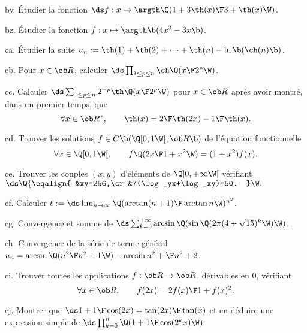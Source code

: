 \exo [Level=1,Fight=2,Learn=1,Field=\Fonctions,Type=\Exercices,Origin=] by. 
Étudier la fonction $\ds f:x\mapsto\argth\Q({1+3\th(x)\F3+\th(x)}\W)$. 

\exo [Level=1,Fight=2,Learn=1,Field=\Fonctions,Type=\Exercices,Origin=] bz. 
Étudier la fonction $f:x\mapsto\argth\b(4x^3-3x\b)$. 

\exo [Level=1,Fight=1,Learn=1,Field=\Suites|\TrigonométrieHyperbolique,Type=\Exercices,Origin=] ca. 
Étudier la suite $u_n:=\th(1)+\th(2)+\cdots+\th(n)-\ln\b(\ch(n)\b)$. 

\exo [Level=1,Fight=1,Learn=0,Field=\TrigonométrieHyperbolique,Type=\Exercices,Origin=] cb. 
Pour $x\in\ob R$, calculer $\ds\prod_{1\le p\le n}\ch\Q({x\F 2^p}\W)$. 

\exo [Level=1,Fight=1,Learn=1,Field=\TrigonométrieHyperbolique,Type=\Exercices,Origin=] cc. 
Calculer $\ds\sum_{1\le p\le n}2^{-p}\th\Q({x\F2^p}\W)$ pour $x\in\ob R$ après avoir montré, dans un premier temps, que 
$$
\forall x\in\ob R^*, \qquad \th(x)={2\F\th(2x)}-{1\F \th(x)}.
$$

\exo  [Level=1,Fight=3,Learn=1,Field=\Fonctions|\Trigonométrie,Type=\Exercices,Origin=] cd. 
Trouver les solutions $f\in\sc C\b(\Q[0,1\W[,\ob R\b)$ de l'équation fonctionnelle
$$
\forall x\in\Q[0,1\W[,\qquad f\Q({2x\F1+x^2}\W)=(1+x^2)f(x).
$$

\exo [Level=1,Fight=1,Learn=0,Field=\Fonctions,Type=\Exercices,Origin=] ce. 
Trouver les couples $(x,y)$ d'éléments de $\Q]0,+\infty\W[$ vérifiant 
$\ds 
\Q\{\eqalign{
&xy=256,\cr
&7(\log_yx+\log_xy)=50.
}\W.
$

\exo [Level=1,Fight=2,Learn=1,Field=\DéveloppementsLimités,Type=\Exercices,Origin=,Solution={$\ell=\e^{-2/\pi}$}] cf. 
Calculer $\ell:=\ds \lim_{n\to\infty}\Q({\arctan(n+1)\F\arctan n}\W)^{n^2}$. 

\exo [Level=2,Fight=3,Learn=1,Field=\Séries,Type=\Exercices,Origin=] cg. 
Convergence et somme de $\ds\sum_{k=0}^{+\infty}\arcsin\Q(\sin\Q(2\pi(4+\sqrt{15})^k\W)\W)$. 

\exo [Level=2,Fight=2,Learn=1,Field=\Séries,Type=\Exercices,Origin=] ch. 
Convergence de la série de terme général $u_n=\arcsin\Q({n^2\F n^2+1}\W)-\arcsin{n^2+\F n^2+2}$. 

\exo [Level=1,Fight=3,Learn=1,Field=\Fonctions,Type=\Exercices,Origin=] ci. 
Trouver toutes les applications $f:\ob R\to\ob R$, dérivables en $0$, vérifiant 
$$
\forall x\in\ob R, \qquad f(2x)={2f(x)\F1+f(x)^2}.
$$

\exo [Level=1,Fight=1,Learn=1,Field=\Trigonométrie,Type=\Exercices,Origin=] cj. 
Montrer que $\ds1+{1\F\cos(2x)}={\tan(2x)\F\tan(x)}$ et en déduire une expression simple de $\ds
\prod_{k=0}^n\Q(1+{1\F\cos(2^kx)}\W).
$

